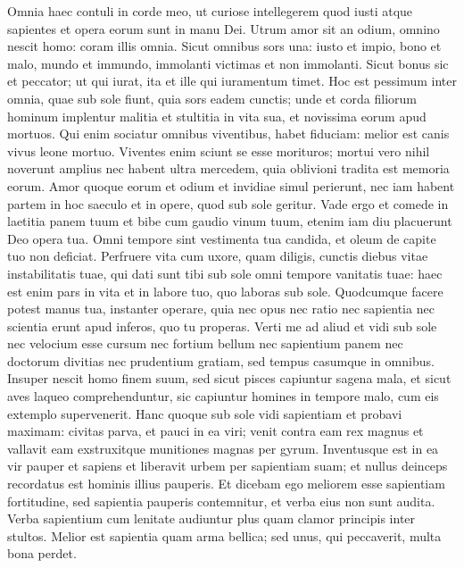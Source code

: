 \begin{biblechapter}
\begin{biblechapter}
\begin{biblechapter}
\begin{biblechapter}
\begin{biblechapter}
\begin{biblechapter}
\begin{biblechapter}
\begin{biblechapter}
\begin{biblechapter}
\verse Omnia haec contuli in corde meo, ut curiose intellegerem quod iusti atque sapientes et opera eorum sunt in manu Dei. Utrum amor sit an odium, omnino nescit homo: coram illis omnia.
 \verse Sicut omnibus sors una:
 iusto et impio,
 bono et malo,
 mundo et immundo,
 immolanti victimas et non immolanti.
 Sicut bonus sic et peccator;
 ut qui iurat, ita et ille qui iuramentum timet.
 \verse Hoc est pessimum inter omnia, quae sub sole fiunt, quia sors eadem cunctis; unde et corda filiorum hominum implentur malitia et stultitia in vita sua, et novissima eorum apud mortuos. 
\verse Qui enim sociatur omnibus viventibus, habet fiduciam: melior est canis vivus leone mortuo. 
\verse Viventes enim sciunt se esse morituros; mortui vero nihil noverunt amplius nec habent ultra mercedem, quia oblivioni tradita est memoria eorum. 
\verse Amor quoque eorum et odium et invidiae simul perierunt, nec iam habent partem in hoc saeculo et in opere, quod sub sole geritur.
 \verse Vade ergo et comede in laetitia panem tuum
 et bibe cum gaudio vinum tuum,
 etenim iam diu placuerunt Deo opera tua.
 \verse Omni tempore sint vestimenta tua candida,
 et oleum de capite tuo non deficiat.
 \verse Perfruere vita cum uxore, quam diligis, cunctis diebus vitae instabilitatis tuae, qui dati sunt tibi sub sole omni tempore vanitatis tuae: haec est enim pars in vita et in labore tuo, quo laboras sub sole. 
\verse Quodcumque facere potest manus tua, instanter operare, quia nec opus nec ratio nec sapientia nec scientia erunt apud inferos, quo tu properas.
 \verse Verti me ad aliud et vidi sub sole nec velocium esse cursum nec fortium bellum nec sapientium panem nec doctorum divitias nec prudentium gratiam, sed tempus casumque in omnibus. 
\verse Insuper nescit homo finem suum, sed sicut pisces capiuntur sagena mala, et sicut aves laqueo comprehenduntur, sic capiuntur homines in tempore malo, cum eis extemplo supervenerit.
 \verse Hanc quoque sub sole vidi sapientiam et probavi maximam: 
\verse civitas parva, et pauci in ea viri; venit contra eam rex magnus et vallavit eam exstruxitque munitiones magnas per gyrum. 
\verse Inventusque est in ea vir pauper et sapiens et liberavit urbem per sapientiam suam; et nullus deinceps recordatus est hominis illius pauperis.
 \verse Et dicebam ego meliorem esse sapientiam fortitudine,
 sed sapientia pauperis contemnitur,
 et verba eius non sunt audita.
 \verse Verba sapientium cum lenitate audiuntur
 plus quam clamor principis inter stultos.
 \verse Melior est sapientia quam arma bellica;
 sed unus, qui peccaverit, multa bona perdet.
 

\end{biblechapter}
\end{biblechapter}
\end{biblechapter}
\end{biblechapter}
\end{biblechapter}
\end{biblechapter}
\end{biblechapter}
\end{biblechapter}
\end{biblechapter}
